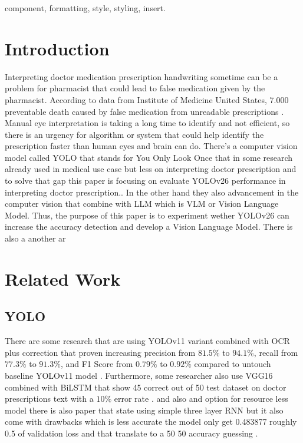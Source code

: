 \documentclass[conference, a4paper]{IEEEtran}
\begin{document}
\begin{IEEEkeywords}
component, formatting, style, styling, insert.
\end{IEEEkeywords}

\section{Introduction}
Interpreting doctor medication prescription handwriting sometime can be a problem for pharmacist that could lead to false medication given by the pharmacist. According to data from Institute of Medicine United States, 7.000 preventable death caused by false medication from unreadable prescriptions \cite{achkar2019medical}. Manual eye interpretation is taking a long time to identify and not efficient, so there is an urgency for algorithm or system that could help identify the prescription faster than human eyes and brain can do. There's a computer vision model called YOLO that stands for You Only Look Once that in some research already used in medical use case but less on interpreting doctor prescription and to solve that gap this paper is focusing on evaluate YOLOv26 performance in interpreting doctor prescription.\cite{sapkota2025yolo26}. In the other hand they also advancement in the computer vision that combine with LLM which is VLM or Vision Language Model. Thus, the purpose of this paper is to experiment wether YOLOv26 can increase the accuracy detection and develop a Vision Language Model. There is also a another ar

\section{Related Work}
\subsection{YOLO}
There are some research that are using YOLOv11 variant combined with OCR plus correction that proven increasing precision from $81.5\%$ to $94.1\%$, recall from $77.3\%$ to $91.3\%$, and F1 Score from $0.79\%$ to $0.92\%$ compared to untouch baseline YOLOv11 model \cite{jeevidha2026advanced}. Furthermore, some researcher also use VGG16 combined with BiLSTM that show 45 correct out of 50 test dataset on doctor prescriptions text with a $10\%$ error rate \cite{achkar2019medical}. and also and option for resource less model there is also paper that state using simple three layer RNN but it also come with drawbacks which is less accurate the model only get 0.483877 roughly 0.5 of validation loss and that translate to a 50 50 accuracy guessing \cite{shaw2021medical}.  
\end{document}
